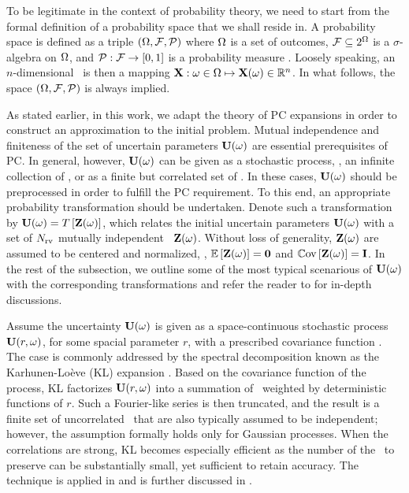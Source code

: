 To be legitimate in the context of probability theory, we need to start from the formal definition of a probability space that we shall reside in. A probability space is defined as a triple $(\Omega, \mathcal{F}, \mathcal{P})$ where $\Omega$ is a set of outcomes, $\mathcal{F} \subseteq 2^\Omega$ is a $\sigma$-algebra on $\Omega$, and $\mathcal{P}: \mathcal{F} \to [0, 1]$ is a probability measure \cite{durrett2010}. Loosely speaking, an $n$-dimensional \rv\ is then a mapping $\mathbf{X}: \omega \in \Omega \mapsto \mathbf{X}(\omega) \in \mathbb{R}^n$. In what follows, the space $(\Omega, \mathcal{F}, \mathcal{P})$ is always implied.

As stated earlier, in this work, we adapt the theory of PC expansions in order to construct an approximation to the initial problem. Mutual independence and finiteness of the set of uncertain parameters $\mathbf{U}(\omega)$ are essential prerequisites of PC. In general, however, $\mathbf{U}(\omega)$ can be given as a stochastic process, \ie, an infinite collection of \rvs, or as a finite but correlated set of \rvs. In these cases, $\mathbf{U}(\omega)$ should be preprocessed in order to fulfill the PC requirement. To this end, an appropriate probability transformation should be undertaken. Denote such a transformation by $\mathbf{U}(\omega) = T\left[\mathbf{Z}(\omega)\right]$, which relates the initial uncertain parameters $\mathbf{U}(\omega)$ with a set of ${N_\text{rv}}$ mutually independent \rvs\ $\mathbf{Z}(\omega)$. Without loss of generality, $\mathbf{Z}(\omega)$ are assumed to be centered and normalized, \ie, $\oExp{\vZ(\o)} = \mZero$ and $\oCov{\vZ(\o)} = \mI$. In the rest of the subsection, we outline some of the most typical scenarious of $\mathbf{U}(\omega)$ with the corresponding transformations and refer the reader to \cite{xiu2010, eldred2009} for in-depth discussions.

Assume the uncertainty $\mathbf{U}(\omega)$ is given as a space-continuous stochastic process $\mathbf{U}(r, \omega)$, for some spacial parameter $r$, with a prescribed covariance function \cite{durrett2010}. The case is commonly addressed by the spectral decomposition known as the Karhunen-Lo\`{e}ve (KL) expansion \cite{xiu2010, maitre2010, ghanem1991}. Based on the covariance function of the process, KL factorizes $\mathbf{U}(r, \omega)$ into a summation of \rvs\ weighted by deterministic functions of $r$. Such a Fourier-like series is then truncated, and the result is a finite set of uncorrelated \rvs\ that are also typically assumed to be independent; however, the assumption formally holds only for Gaussian processes. When the correlations are strong, KL becomes especially efficient as the number of the \rvs\ to preserve can be substantially small, yet sufficient to retain accuracy. The technique is applied in  and is further discussed in .

